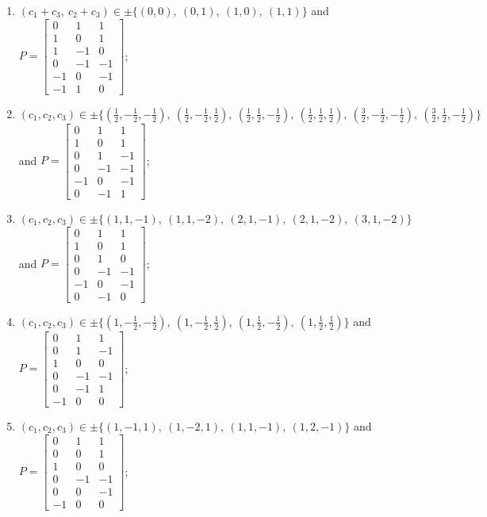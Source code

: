 \begin{enumerate}
\item[(d21)] $(c_1+c_3,\ c_2+c_3)\in \pm\{(0,0),\allowbreak\ (0,1),\allowbreak\ (1,0),\allowbreak\ (1,1)\}$ and $P=\begin{bmatrix}0&1&1\\1&0&1\\1&-1&0\\0&-1&-1\\-1&0&-1\\-1&1&0\end{bmatrix}$;
\item[(d22)] $(c_1,c_2,c_3)\in \pm\{(\tfrac{1}{2},-\tfrac{1}{2},-\tfrac{1}{2}),\allowbreak\ (\tfrac{1}{2},-\tfrac{1}{2},\tfrac{1}{2}),\allowbreak\ (\tfrac{1}{2},\tfrac{1}{2},-\tfrac{1}{2}),\allowbreak\ (\tfrac{1}{2},\tfrac{1}{2},\tfrac{1}{2}),\allowbreak\ (\tfrac{3}{2},-\tfrac{1}{2},-\tfrac{1}{2}),\allowbreak\ (\tfrac{3}{2},\tfrac{1}{2},-\tfrac{1}{2})\}$ and $P=\begin{bmatrix}0&1&1\\1&0&1\\0&1&-1\\0&-1&-1\\-1&0&-1\\0&-1&1\end{bmatrix}$;
\item[(d23)] $(c_1,c_2,c_3)\in \pm\{(1,1,-1),\allowbreak\ (1,1,-2),\allowbreak\ (2,1,-1),\allowbreak\ (2,1,-2),\allowbreak\ (3,1,-2)\}$ and $P=\begin{bmatrix}0&1&1\\1&0&1\\0&1&0\\0&-1&-1\\-1&0&-1\\0&-1&0\end{bmatrix}$;
\item[(d24)] $(c_1,c_2,c_3)\in \pm\{(1,-\tfrac{1}{2},-\tfrac{1}{2}),\allowbreak\ (1,-\tfrac{1}{2},\tfrac{1}{2}),\allowbreak\ (1,\tfrac{1}{2},-\tfrac{1}{2}),\allowbreak\ (1,\tfrac{1}{2},\tfrac{1}{2})\}$ and $P=\begin{bmatrix}0&1&1\\0&1&-1\\1&0&0\\0&-1&-1\\0&-1&1\\-1&0&0\end{bmatrix}$;
\item[(d25)] $(c_1,c_2,c_3)\in \pm\{(1,-1,1),\allowbreak\ (1,-2,1),\allowbreak\ (1,1,-1),\allowbreak\ (1,2,-1)\}$ and $P=\begin{bmatrix}0&1&1\\0&0&1\\1&0&0\\0&-1&-1\\0&0&-1\\-1&0&0\end{bmatrix}$;

\end{enumerate}
